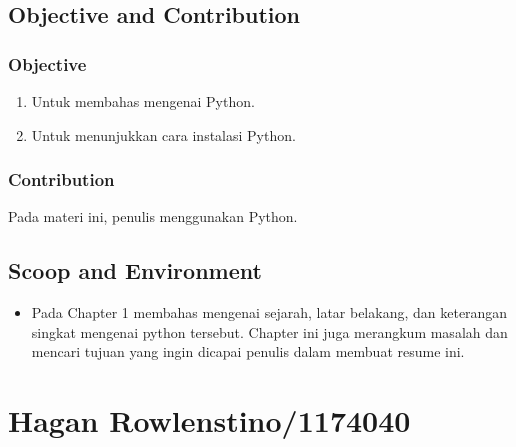 \subsection{Objective and Contribution}
\subsubsection{Objective}
\begin{enumerate}
	\item Untuk membahas mengenai Python.
	\item Untuk menunjukkan cara instalasi Python.
\end{enumerate}

\subsubsection{Contribution}
Pada materi ini, penulis menggunakan Python.

\subsection{Scoop and Environment}
\begin{itemize}
	\item Pada Chapter 1 membahas mengenai sejarah, latar belakang, dan keterangan singkat mengenai python tersebut. Chapter ini juga merangkum masalah dan mencari tujuan yang ingin dicapai penulis dalam membuat resume ini.
\end{itemize}

\section{Hagan Rowlenstino/1174040}
